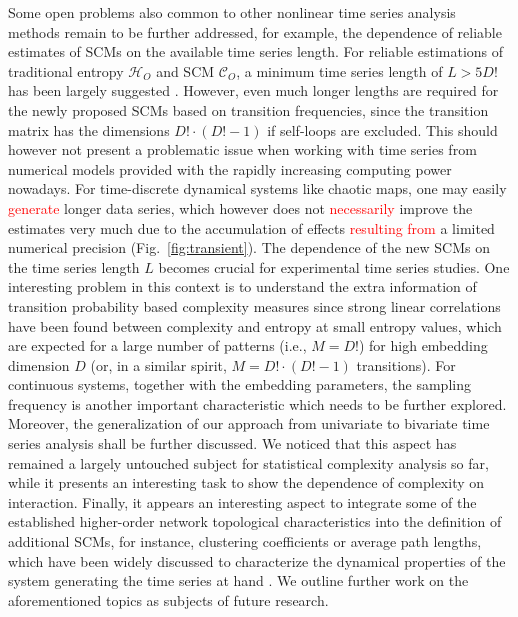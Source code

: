 \documentclass[aip,cha,reprint,nofootinbib]{revtex4-1}
\begin{document}
Some open problems also common to other nonlinear time series analysis methods remain to be further addressed, for example, the dependence of reliable estimates of SCMs on the available time series length. {\color{red}For reliable estimations of traditional entropy $\mathcal{H}_O$ and SCM $\mathcal{C}_O$, a minimum time series length of $L > 5 D!$ has been largely suggested \cite{BandtPRL2002,AmigoPTRSA2014}. However, even much longer lengths are required for the newly proposed SCMs based on transition frequencies, since the transition matrix has the dimensions $D!\cdot (D! - 1)$ if self-loops are excluded. This should however not present a problematic issue when working with time series from numerical models provided with the rapidly increasing computing power nowadays.} For time-discrete dynamical systems like chaotic maps, one may easily \textcolor{red}{generate} longer data series, which however does not \textcolor{red}{necessarily} improve the estimates very much due to the accumulation of effects \textcolor{red}{resulting from} a limited numerical precision (Fig.~\ref{fig:transient}). {\color{red}The dependence of the new SCMs on the time series length $L$ becomes crucial for experimental time series studies. One interesting problem in this context is to understand the extra information of transition probability based complexity measures since strong linear correlations have been found between complexity and entropy at small entropy values, which are expected for a large number of patterns (i.e., $M = D!$) for high embedding dimension $D$ (or, in a similar spirit, $M = D! \cdot (D!-1)$ transitions).} For continuous systems, together with the embedding parameters, the sampling frequency is another important characteristic which needs to be further explored. Moreover, the generalization of our approach from univariate to bivariate time series analysis shall be further discussed. We noticed that this aspect has remained a largely untouched subject for statistical complexity analysis so far, while it presents an interesting task to show the dependence of complexity on interaction. {\color{red}Finally, it appears an interesting aspect to integrate some of the established higher-order network topological characteristics into the definition of additional SCMs, for instance, clustering coefficients or average path lengths, which have been widely discussed to characterize the dynamical properties of the system generating the time series at hand \cite{ZouPR2018}.} We outline further work on the aforementioned topics as subjects of future research. 
\end{document}
